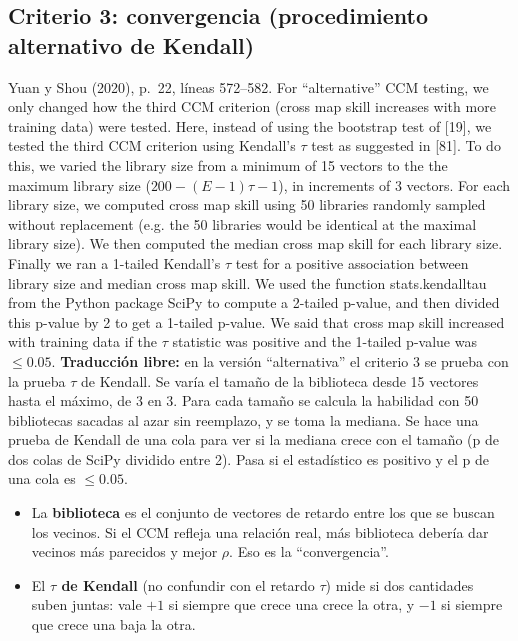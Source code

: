 \documentclass[11pt,openany]{book}
\begin{document}
\subsection*{Criterio 3: convergencia (procedimiento alternativo de Kendall)}

\begin{cita}{Yuan y Shou (2020), p.~22, líneas 572--582.}
For “alternative” CCM testing, we only changed how the third CCM criterion (cross map skill increases with more training data) were tested. Here, instead of using the bootstrap test of [19], we tested the third CCM criterion using Kendall’s $\tau$ test as suggested in [81]. To do this, we varied the library size from a minimum of 15 vectors to the the maximum library size ($200-(E-1)\tau-1$), in increments of 3 vectors. For each library size, we computed cross map skill using 50 libraries randomly sampled without replacement (e.g. the 50 libraries would be identical at the maximal library size). We then computed the median cross map skill for each library size. Finally we ran a 1-tailed Kendall’s $\tau$ test for a positive association between library size and median cross map skill. We used the function stats.kendalltau from the Python package SciPy to compute a 2-tailed p-value, and then divided this p-value by 2 to get a 1-tailed p-value. We said that cross map skill increased with training data if the $\tau$ statistic was positive and the 1-tailed p-value was $\le 0.05$.
\tcblower
\textbf{Traducción libre:} en la versión ``alternativa'' el criterio 3 se prueba con la prueba $\tau$ de Kendall. Se varía el tamaño de la biblioteca desde 15 vectores hasta el máximo, de 3 en 3. Para cada tamaño se calcula la habilidad con 50 bibliotecas sacadas al azar sin reemplazo, y se toma la mediana. Se hace una prueba de Kendall de una cola para ver si la mediana crece con el tamaño (p de dos colas de SciPy dividido entre 2). Pasa si el estadístico es positivo y el p de una cola es $\le 0.05$.
\end{cita}

\begin{nota}
\begin{itemize}
\item La \textbf{biblioteca} es el conjunto de vectores de retardo entre los que se buscan los vecinos. Si el CCM refleja una relación real, más biblioteca debería dar vecinos más parecidos y mejor $\rho$. Eso es la ``convergencia''.
\item El \textbf{$\tau$ de Kendall} (no confundir con el retardo $\tau$) mide si dos cantidades suben juntas: vale $+1$ si siempre que crece una crece la otra, y $-1$ si siempre que crece una baja la otra.
\end{itemize}
\end{nota}
\end{document}
